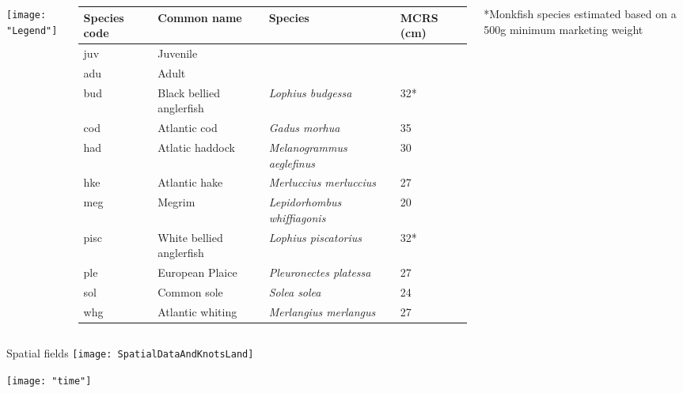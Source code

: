 \documentclass[xcolor=x11names,compress]{beamer}
\renewcommand{\(}{\begin{columns}}
\renewcommand{\)}{\end{columns}}
\newcommand{\<}[1]{\begin{column}{#1}}
\renewcommand{\>}{\end{column}}
\begin{document}
\begin{frame}

\begin{columns}
\texttt{[image: "Legend"]}

\begin{table}[!htb]
	\tiny
	\center
	\begin{tabular}{ p{1cm} p{2cm} p{3cm} p{1cm}}
		\hline
		Species code & Common name              & Species & MCRS (cm) \\
		\hline
		juv          & Juvenile                 & & \\
		adu          & Adult                    & & \\
		\hline
		bud          & Black bellied anglerfish & \textit{Lophius budgessa} & 32* \\
		cod          & Atlantic cod             & \textit{Gadus morhua} & 35 \\
		had          & Atlatic haddock          & \textit{Melanogrammus	aeglefinus} & 30 \\
		hke          & Atlantic hake            & \textit{Merluccius merluccius} & 27 \\
		meg          & Megrim                   & \textit{Lepidorhombus whiffiagonis} & 20\\
		pisc         & White bellied anglerfish & \textit{Lophius piscatorius} & 32* \\
		ple          & European Plaice          & \textit{Pleuronectes platessa} & 27 \\
		sol          & Common sole              & \textit{Solea solea} & 24 \\
		whg          & Atlantic whiting         & \textit{Merlangius merlangus} & 27 \\
		\hline
		\end{tabular}
		*Monkfish species estimated based on a 500g minimum marketing weight


\end{table}

\end{columns}
\end{frame}

\begin{frame}{Spatial fields}
\centering
\texttt{[image: SpatialDataAndKnotsLand]}
\end{frame}


\begin{frame}
\centering
\texttt{[image: "time"]}

\end{frame}
\end{document}
